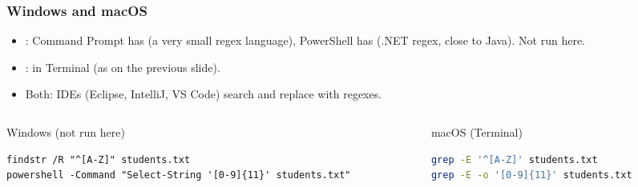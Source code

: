 \documentclass[aspectratio=169,10pt,compress]{beamer}
\begin{document}
\begin{frame}[t,fragile] \frametitle{Windows and macOS}
  \begin{itemize}\small
    \item \win: Command Prompt has  (a very small regex language), PowerShell has  (.NET regex, close to Java). Not run here.
    \item \mac:  in Terminal (as on the previous slide).
    \item Both: IDEs (Eclipse, IntelliJ, VS Code) search and replace with regexes.
  \end{itemize}
  \begin{columns}[T]
    \begin{column}{0.48\textwidth}
      \begin{block}{Windows (not run here)}


\begin{lstlisting}[style=codesnippet, language={}, basicstyle=\ttfamily\scriptsize]
findstr /R "^[A-Z]" students.txt
powershell -Command "Select-String '[0-9]{11}' students.txt"
\end{lstlisting}


      \end{block}
    \end{column}
    \begin{column}{0.48\textwidth}
      \begin{block}{macOS (Terminal)}


\begin{lstlisting}[style=codesnippet, language=bash, basicstyle=\ttfamily\scriptsize]
grep -E '^[A-Z]' students.txt
grep -E -o '[0-9]{11}' students.txt
\end{lstlisting}


      \end{block}
    \end{column}
  \end{columns}
\end{frame}

\end{document}
